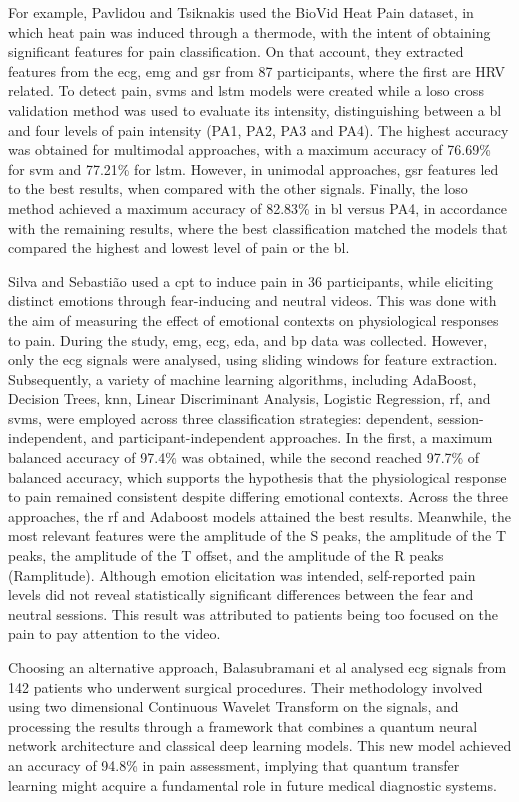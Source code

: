 For example, Pavlidou and Tsiknakis \cite{Pavlidou2025} used the BioVid Heat Pain dataset, in which heat pain was induced through a thermode, with the intent of obtaining significant features for pain classification. On that account, they extracted features from the \ac{ecg}, \ac{emg} and \ac{gsr} from 87 participants, where the first are HRV related. To detect pain, \acp{svm} and \ac{lstm} models were created while a \ac{loso} cross validation method was used to evaluate its intensity, distinguishing between a \ac{bl} and four levels of pain intensity (PA1, PA2, PA3 and PA4). The highest accuracy was obtained for multimodal approaches, with a maximum accuracy of 76.69\% for \ac{svm} and 77.21\% for \ac{lstm}. However, in unimodal approaches, \ac{gsr} features led to the best results, when compared with the other signals. Finally, the \ac{loso} method achieved a maximum accuracy of 82.83\% in \ac{bl} versus PA4, in accordance with the remaining results, where the best classification matched the models that compared the highest and lowest level of pain or the \ac{bl}.

Silva and Sebastião \cite{Silva2023} used a \ac{cpt} to induce pain in 36 participants, while eliciting distinct emotions through fear-inducing and neutral videos. This was done with the aim of measuring the effect of emotional contexts on physiological responses to pain. During the study, \ac{emg}, \ac{ecg}, \ac{eda}, and \ac{bp} data was collected. However, only the \ac{ecg} signals were analysed, using sliding windows for feature extraction. Subsequently, a variety of machine learning algorithms, including AdaBoost, Decision Trees, \ac{knn}, Linear Discriminant Analysis, Logistic Regression, \ac{rf}, and \acp{svm}, were employed across three classification strategies: dependent, session-independent, and participant-independent approaches. In the first, a maximum balanced accuracy of 97.4\% was obtained, while the second reached 97.7\% of balanced accuracy, which supports the hypothesis that the physiological response to pain remained consistent despite differing emotional contexts. Across the three approaches, the \ac{rf} and Adaboost models attained the best results. Meanwhile, the most relevant features were the amplitude of the S peaks, the amplitude of the T peaks, the amplitude of the T offset, and the amplitude of the R peaks (Ramplitude). Although emotion elicitation was intended, self-reported pain levels did not reveal statistically significant differences between the fear and neutral sessions. This result was attributed to patients being too focused on the pain to pay attention to the video.

Choosing an alternative approach, Balasubramani et al \cite{Balasubramani2025} analysed \ac{ecg} signals from 142 patients who underwent surgical procedures. Their methodology involved using two dimensional Continuous Wavelet Transform on the signals, and processing the results through a framework that combines a quantum neural network architecture and classical deep learning models. This new model achieved an accuracy of 94.8\% in pain assessment, implying that quantum transfer learning might acquire a fundamental role in future medical diagnostic systems. 





